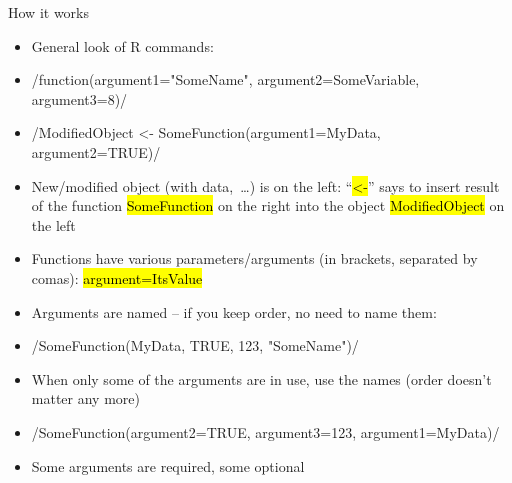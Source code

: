 \documentclass[compress, ucs, xelatex, 11pt, xcolor=svgnames,
  hyperref={
    bookmarks=true,
    unicode=true,
    colorlinks=true,
    pdftitle={Molecular data in R},
    plainpages=false,
    pdfauthor={Vojtech Zeisek},
    pdfsubject={Course about phylogeny and evolution in R},
    pdfcreator={XeLaTeX},
    pdfkeywords={R, evolution, phylogeny, molecular data},
    linkcolor=Tomato,
    anchorcolor=SaddleBrown,
    citecolor=Goldenrod,
    filecolor=DarkMagenta,
    menucolor=Sienna,
    urlcolor=DarkTurquoise,
    pdftex},
  url={hyphens, lowtilde} %
  ]{beamer}
\renewcommand{\texttt}[1]{\hl{\ttfamily #1}}
\begin{document}
\begin{frame}{How it works}
\begin{itemize}
 \item General look of R commands:
 \item \splus/function(argument1="SomeName", argument2=SomeVariable, argument3=8)/
 \item \splus/ModifiedObject <- SomeFunction(argument1=MyData, argument2=TRUE)/
 \item New/modified object (with data,~\ldots) is on the left: ``\texttt{<-}'' says to insert result of the function \texttt{SomeFunction} on the right into the object \texttt{ModifiedObject} on the left
 \item Functions have various parameters/arguments (in brackets, separated by comas): \texttt{argument=ItsValue}
 \item Arguments are named -- if you keep order, no need to name them:
 \item \splus/SomeFunction(MyData, TRUE, 123, "SomeName")/
 \item When only some of the arguments are in use, use the names (order doesn't matter any more)
 \item \splus/SomeFunction(argument2=TRUE, argument3=123, argument1=MyData)/
 \item Some arguments are required, some optional
\end{itemize}
\end{frame}
\end{document}
